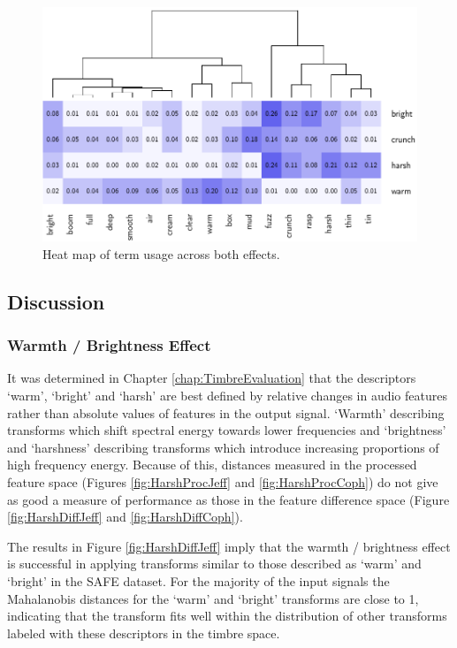 			\begin{figure}[h!]
				\centering
				\includegraphics{chapter7/Images/CombinedConfusion.pdf}
				\caption{Heat map of term usage across both effects.}
				\label{fig:CombConfusion}
			\end{figure}

	\subsection{Discussion}
	\label{sec:PerceptualExperiments-SemanticControl-Discussion}
		\subsubsection*{Warmth / Brightness Effect}
			It was determined in Chapter \ref{chap:TimbreEvaluation} that the descriptors `warm', `bright' and
			`harsh' are best defined by relative changes in audio features rather than absolute values of
			features in the output signal. `Warmth' describing transforms which shift spectral energy towards
			lower frequencies and `brightness' and `harshness' describing transforms which introduce increasing
			proportions of high frequency energy. Because of this, distances measured in the processed feature
			space (Figures \ref{fig:HarshProcJeff} and \ref{fig:HarshProcCoph}) do not give as good a measure
			of performance as those in the feature difference space (Figure \ref{fig:HarshDiffJeff} and
			\ref{fig:HarshDiffCoph}).

			The results in Figure \ref{fig:HarshDiffJeff} imply that the warmth / brightness effect is
			successful in applying transforms similar to those described as `warm' and `bright' in the SAFE
			dataset. For the majority of the input signals the Mahalanobis distances for the `warm' and
			`bright' transforms are close to 1, indicating that the transform fits well within the distribution
			of other transforms labeled with these descriptors in the timbre space.
			
